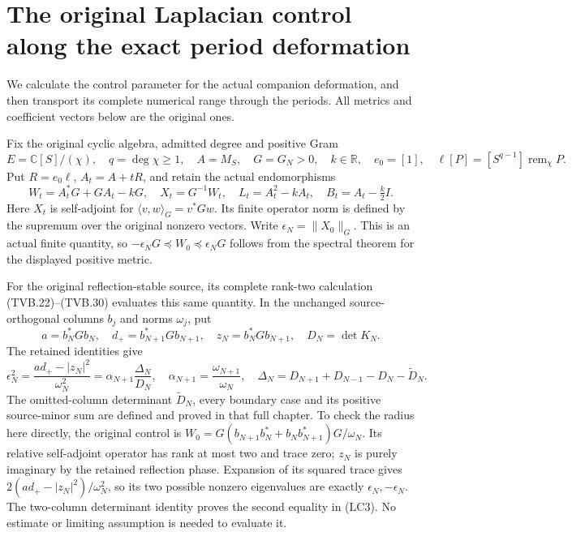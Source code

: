 \section{The original Laplacian control along the exact period deformation}
\label{sec:period-laplacian-control-bridge}

We calculate the control parameter for the actual companion deformation,
and then transport its complete numerical range through the periods.
All metrics and coefficient vectors below are the original ones.

Fix the original cyclic algebra, admitted degree and positive Gram
\[
 E=\mathbb C[S]/(\chi),\quad q=\deg\chi\ge1,\quad
 A=M_S,\quad G=G_N>0,\quad k\in\mathbb R,
 \quad e_0=[1],\quad
 \ell[P]=[S^{q-1}]\operatorname{rem}_{\chi}P.
 \tag{LC1}
\]
Put \(R=e_0\ell\), \(A_t=A+tR\), and retain the actual endomorphisms
\[
 W_t=A_t^*G+GA_t-kG,\quad X_t=G^{-1}W_t,\quad
 L_t=A_t^2-kA_t,\quad B_t=A_t-\tfrac k2I.
 \tag{LC2}
\]
Here \(X_t\) is self-adjoint for
\(\langle v,w\rangle_G=v^*Gw\). Its finite operator norm is defined
by the supremum over the original nonzero vectors. Write
\(\epsilon_N=\|X_0\|_G\). This is an actual finite quantity, so
\(-\epsilon_NG\preceq W_0\preceq\epsilon_NG\) follows from the
spectral theorem for the displayed positive metric.

For the original reflection-stable source, its complete rank-two
calculation (TVB.22)--(TVB.30) evaluates this same quantity. In the
unchanged source-orthogonal columns \(b_j\) and norms \(\omega_j\),
put
\[
 a=b_N^*Gb_N,\quad d_+=b_{N+1}^*Gb_{N+1},\quad
 z_N=b_N^*Gb_{N+1},\quad D_N=\det K_N.
\]
The retained identities give
\[
 \epsilon_N^2=\frac{ad_+-|z_N|^2}{\omega_N^2}
       =\alpha_{N+1}\frac{\Delta_N}{D_N},
 \quad\alpha_{N+1}=\frac{\omega_{N+1}}{\omega_N},
 \quad
 \Delta_N=D_{N+1}+D_{N-1}-D_N-\widetilde D_N.
 \tag{LC3}
\]
The omitted-column determinant \(\widetilde D_N\), every boundary
case and its positive source-minor sum are defined and proved in
that full chapter. To check the radius here directly, the original
control is
\(W_0=G(b_{N+1}b_N^*+b_Nb_{N+1}^*)G/\omega_N\).
Its relative self-adjoint operator has rank at most two and trace
zero; \(z_N\) is purely imaginary by the retained reflection phase.
Expansion of its squared trace gives
\(2(ad_+-|z_N|^2)/\omega_N^2\), so its two possible nonzero
eigenvalues are exactly \(\epsilon_N,-\epsilon_N\).
The two-column determinant identity proves the second equality
in (LC3). No estimate or limiting assumption is needed to evaluate it.

